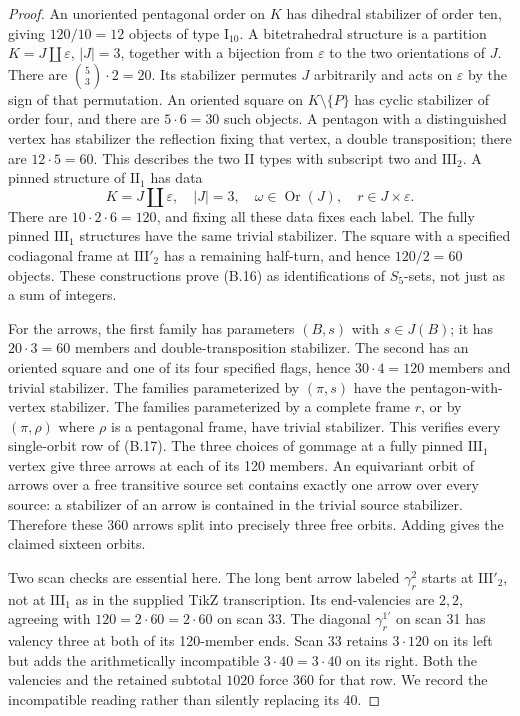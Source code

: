 \begin{proof}
An unoriented pentagonal order on $K$ has dihedral stabilizer of
order ten, giving $120/10=12$ objects of type $\mathrm I_{10}$.
A bitetrahedral structure is a partition $K=J\amalg\varepsilon$,
$|J|=3$, together with a bijection from $\varepsilon$ to the two
orientations of $J$.  There are $\binom53\cdot2=20$.  Its stabilizer
permutes $J$ arbitrarily and acts on $\varepsilon$ by the sign of
that permutation.  An oriented square on $K\setminus\{P\}$ has
cyclic stabilizer of order four, and there are $5\cdot6=30$ such
objects.  A pentagon with a distinguished vertex has stabilizer
the reflection fixing that vertex, a double transposition; there
are $12\cdot5=60$.  This describes the two $\mathrm {II}$ types
with subscript two and $\mathrm {III}_2$.  A pinned structure of
$\mathrm {II}_1$ has data
\[
 K=J\amalg\varepsilon,\quad |J|=3,\quad
 \omega\in\operatorname{Or}(J),\quad r\in J\times\varepsilon.
\]
There are $10\cdot2\cdot6=120$, and fixing all these data fixes
each label.  The fully pinned $\mathrm {III}_1$ structures have
the same trivial stabilizer.  The square with a specified
codiagonal frame at $\mathrm {III}'_2$ has a remaining half-turn,
and hence $120/2=60$ objects.  These constructions prove (B.16)
as identifications of $S_5$-sets, not just as a sum of integers.

For the arrows, the first family has parameters $(B,s)$ with
$s\in J(B)$; it has $20\cdot3=60$ members and double-transposition
stabilizer.  The second has an oriented square and one of its four
specified flags, hence $30\cdot4=120$ members and trivial
stabilizer.  The families parameterized by $(\pi,s)$ have the
pentagon-with-vertex stabilizer.  The families parameterized by a
complete frame $r$, or by $(\pi,\rho)$ where $\rho$ is a pentagonal
frame, have trivial stabilizer.  This verifies every single-orbit
row of (B.17).  The three choices of gommage at a fully pinned
$\mathrm {III}_1$ vertex give three arrows at each of its 120
members.  An equivariant orbit of arrows over a free transitive
source set contains exactly one arrow over every source: a
stabilizer of an arrow is contained in the trivial source
stabilizer.  Therefore these $360$ arrows split into precisely
three free orbits.  Adding gives the claimed sixteen orbits.

Two scan checks are essential here.  The long bent arrow labeled
$\gamma_r^2$ starts at $\mathrm {III}'_2$, not at
$\mathrm {III}_1$ as in the supplied TikZ transcription.  Its
end-valencies are $2,2$, agreeing with $120=2\cdot60=2\cdot60$
on scan 33.  The diagonal $\gamma_r^{1'}$ on scan 31 has valency
three at both of its 120-member ends.  Scan 33 retains
$3\cdot120$ on its left but adds the arithmetically incompatible
$3\cdot40=3\cdot40$ on its right.  Both the valencies and the
retained subtotal $1020$ force $360$ for that row.  We record the
incompatible reading rather than silently replacing its $40$.


\end{proof}
